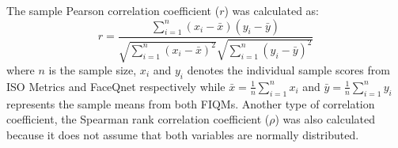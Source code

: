 

The sample Pearson correlation coefficient ($r$) was calculated as: 
\begin{equation}
    {\displaystyle r={\frac {\sum _{i=1}^{n}(x_{i}-{\bar {x}})(y_{i}-{\bar {y}})}{{\sqrt {\sum _{i=1}^{n}(x_{i}-{\bar {x}})^{2}}}{\sqrt {\sum _{i=1}^{n}(y_{i}-{\bar {y}})^{2}}}}}}
\end{equation}
where $n$ is the sample size, $x_{i}$ and $y_{i}$ denotes the individual sample scores from ISO Metrics and FaceQnet respectively while ${\bar {x}}={\frac {1}{n}}\sum _{i=1}^{n}x_{i}$ and ${\bar {y}}={\frac {1}{n}}\sum _{i=1}^{n}y_{i}$ represents the sample means from both FIQMs. Another type of correlation coefficient, the Spearman rank correlation coefficient ($\rho$) \cite{wiki:spearman} was also calculated because it does not assume that both variables are normally distributed.

